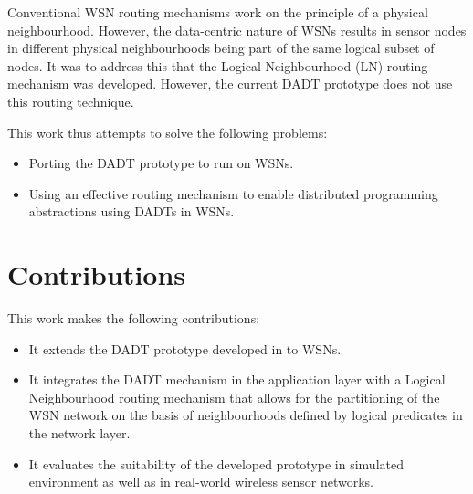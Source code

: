 Conventional WSN routing mechanisms work on the principle of a physical
neighbourhood. However, the data-centric nature of WSNs results in sensor nodes
in different physical neighbourhoods being part of the same logical subset of
nodes. It was to address this that the Logical Neighbourhood (LN)
\cite{mottola_LN:2006} routing mechanism was developed. However, the current
DADT prototype does not use this routing technique.

This work thus attempts to solve the following problems:

\begin{itemize}
  \item Porting the DADT prototype to run on WSNs.
  \item Using an effective routing mechanism to enable distributed programming
  abstractions using DADTs in WSNs.
\end{itemize}

\section{Contributions}

This work makes the following contributions:

\begin{itemize}
\item It extends the DADT prototype developed in \cite{migliavacca_DADT:2006} to WSNs.
\item It integrates the DADT mechanism in the application layer with a Logical
Neighbourhood \cite{mottola_LNAbstraction} routing mechanism that allows for
the partitioning of the WSN network on the basis of neighbourhoods defined by logical predicates in the network layer.
\item It evaluates the suitability of the developed prototype in simulated
environment as well as in real-world wireless sensor networks.
\end{itemize}

